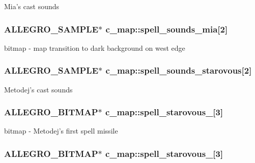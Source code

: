 Mia's cast sounds \hypertarget{classc__map_abb19c6e3c47f8d1182fe746f1e6ccc40}{
\subsubsection[{spell\-\_\-sounds\-\_\-mia}]{\setlength{\rightskip}{0pt plus 5cm}A\-L\-L\-E\-G\-R\-O\-\_\-\-S\-A\-M\-P\-L\-E$\ast$ c\-\_\-map\-::spell\-\_\-sounds\-\_\-mia\mbox{[}2\mbox{]}\hspace{0.3cm}{\ttfamily [protected]}}}\label{classc__map_abb19c6e3c47f8d1182fe746f1e6ccc40}
bitmap -\/ map transition to dark background on west edge \hypertarget{classc__map_ae7b220711fb2815dc1ac925b39fa81ca}{
\subsubsection[{spell\-\_\-sounds\-\_\-starovous}]{\setlength{\rightskip}{0pt plus 5cm}A\-L\-L\-E\-G\-R\-O\-\_\-\-S\-A\-M\-P\-L\-E$\ast$ c\-\_\-map\-::spell\-\_\-sounds\-\_\-starovous\mbox{[}2\mbox{]}\hspace{0.3cm}{\ttfamily [protected]}}}\label{classc__map_ae7b220711fb2815dc1ac925b39fa81ca}
Metodej's cast sounds \hypertarget{classc__map_aaa728703ee5b40637e354f26dcb4f136}{
\subsubsection[{spell\-\_\-starovous\-\_\-1}]{\setlength{\rightskip}{0pt plus 5cm}A\-L\-L\-E\-G\-R\-O\-\_\-\-B\-I\-T\-M\-A\-P$\ast$ c\-\_\-map\-::spell\-\_\-starovous\-\_\mbox{[}3\mbox{]}\hspace{0.3cm}{\ttfamily [protected]}}}\label{classc__map_aaa728703ee5b40637e354f26dcb4f136}
bitmap -\/ Metodej's first spell missile \hypertarget{classc__map_af8e66f5af3e07acfbcf780e21669b1e0}{
\subsubsection[{spell\-\_\-starovous\-\_\-2}]{\setlength{\rightskip}{0pt plus 5cm}A\-L\-L\-E\-G\-R\-O\-\_\-\-B\-I\-T\-M\-A\-P$\ast$ c\-\_\-map\-::spell\-\_\-starovous\-\_\mbox{[}3\mbox{]}\hspace{0.3cm}{\ttfamily [protected]}}}\label{classc__map_af8e66f5af3e07acfbcf780e21669b1e0}
